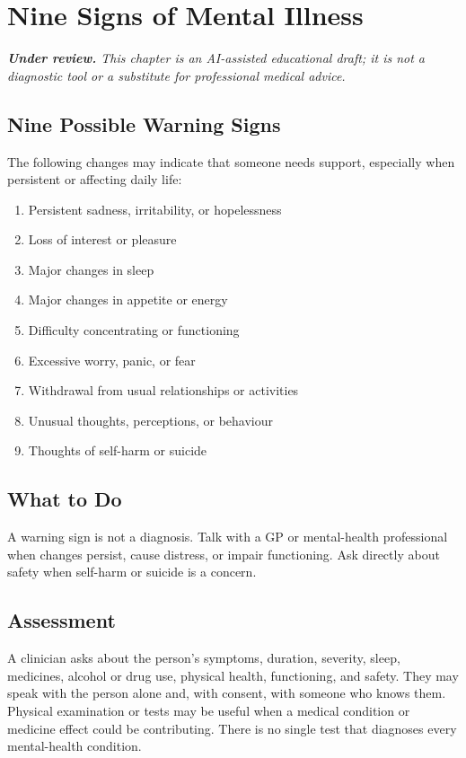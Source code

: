\chapter{Nine Signs of Mental Illness}

\medskip
\noindent\textit{\textbf{Under review.} This chapter is an AI-assisted educational draft; it is not a diagnostic tool or a substitute for professional medical advice.}

\section*{Nine Possible Warning Signs}
The following changes may indicate that someone needs support, especially when persistent or affecting daily life:

\begin{enumerate}
    \item Persistent sadness, irritability, or hopelessness
    \item Loss of interest or pleasure
    \item Major changes in sleep
    \item Major changes in appetite or energy
    \item Difficulty concentrating or functioning
    \item Excessive worry, panic, or fear
    \item Withdrawal from usual relationships or activities
    \item Unusual thoughts, perceptions, or behaviour
    \item Thoughts of self-harm or suicide
\end{enumerate}

\section*{What to Do}
A warning sign is not a diagnosis. Talk with a GP or mental-health professional when changes persist, cause distress, or impair functioning. Ask directly about safety when self-harm or suicide is a concern.

\section*{Assessment}
A clinician asks about the person's symptoms, duration, severity, sleep, medicines, alcohol or drug use, physical health, functioning, and safety. They may speak with the person alone and, with consent, with someone who knows them. Physical examination or tests may be useful when a medical condition or medicine effect could be contributing. There is no single test that diagnoses every mental-health condition.

